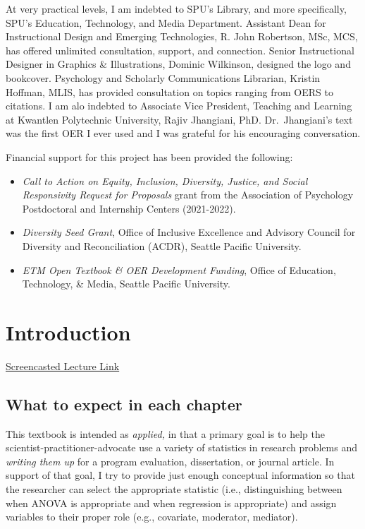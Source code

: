 \documentclass[
  11pt,
]{book}
\providecommand{\tightlist}{%
  \setlength{\itemsep}{0pt}\setlength{\parskip}{0pt}}
\begin{document}
At very practical levels, I am indebted to SPU's Library, and more specifically, SPU's Education, Technology, and Media Department. Assistant Dean for Instructional Design and Emerging Technologies, R. John Robertson, MSc, MCS, has offered unlimited consultation, support, and connection. Senior Instructional Designer in Graphics \& Illustrations, Dominic Wilkinson, designed the logo and bookcover. Psychology and Scholarly Communications Librarian, Kristin Hoffman, MLIS, has provided consultation on topics ranging from OERS to citations. I am alo indebted to Associate Vice President, Teaching and Learning at Kwantlen Polytechnic University, Rajiv Jhangiani, PhD. Dr.~Jhangiani's text \citeyearpar{jhangiani_research_2019} was the first OER I ever used and I was grateful for his encouraging conversation.

Financial support for this project has been provided the following:

\begin{itemize}
\tightlist
\item
  \emph{Call to Action on Equity, Inclusion, Diversity, Justice, and Social Responsivity Request for Proposals} grant from the Association of Psychology Postdoctoral and Internship Centers (2021-2022).
\item
  \emph{Diversity Seed Grant}, Office of Inclusive Excellence and Advisory Council for Diversity and Reconciliation (ACDR), Seattle Pacific University.
\item
  \emph{ETM Open Textbook \& OER Development Funding}, Office of Education, Technology, \& Media, Seattle Pacific University.
\end{itemize}

\hypertarget{ReCintro}{%
\chapter{Introduction}\label{ReCintro}}

\href{https://spu.hosted.panopto.com/Panopto/Pages/Viewer.aspx?pid=cc9b7c0d-e5c3-4e4e-a469-acf7013ee761}{Screencasted Lecture Link}

\hypertarget{what-to-expect-in-each-chapter}{%
\section{What to expect in each chapter}\label{what-to-expect-in-each-chapter}}

This textbook is intended as \emph{applied,} in that a primary goal is to help the scientist-practitioner-advocate use a variety of statistics in research problems and \emph{writing them up} for a program evaluation, dissertation, or journal article. In support of that goal, I try to provide just enough conceptual information so that the researcher can select the appropriate statistic (i.e., distinguishing between when ANOVA is appropriate and when regression is appropriate) and assign variables to their proper role (e.g., covariate, moderator, mediator).
\end{document}
